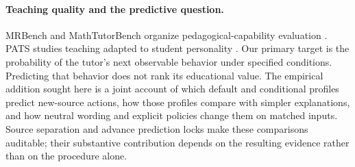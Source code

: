 \paragraph{Teaching quality and the predictive question.}
MRBench and MathTutorBench organize pedagogical-capability evaluation
\citep{maurya2025mrbench,macina2025mathtutorbench}. PATS studies teaching adapted
to student personality \citep{rooein2026pats}. Our primary target is the
probability of the tutor's next observable behavior under specified conditions.
Predicting that behavior does not rank its educational value. The empirical
addition sought here is a joint account of which default and conditional
profiles predict new-source actions, how those profiles compare with simpler
explanations, and how neutral wording and explicit policies change them on
matched inputs. Source separation and advance prediction locks make these
comparisons auditable; their substantive contribution depends on the resulting
evidence rather than on the procedure alone.

